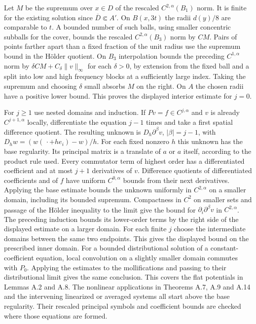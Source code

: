 \documentclass[
  english,
  11pt,
  reqno]{amsart}
\begin{document}
Let \(M\) be the supremum over \(x\in D\) of the rescaled
\(C^{2,\alpha}(B_1)\) norm. It is finite for the existing solution since
\(\overline D\Subset A'\). On \(B(x,3t)\) the radii \(d(y)/8\) are
comparable to \(t\). A bounded number of such balls, using smaller
concentric subballs for the cover, bounds the rescaled
\(C^{2,\alpha}(B_3)\) norm by \(C M\). Pairs of points farther apart
than a fixed fraction of the unit radius use the supremum bound in the
Hölder quotient. On \(B_3\) interpolation bounds the preceding
\(C^{1,\alpha}\) norm by \(\delta C M+C_\delta\|v\|_\infty\) for each
\(\delta>0\), by extension from the fixed ball and a split into low and
high frequency blocks at a sufficiently large index. Taking the supremum
and choosing \(\delta\) small absorbs \(M\) on the right. On \(A\) the
chosen radii have a positive lower bound. This proves the displayed
interior estimate for \(j=0\).

For \(j\ge1\) use nested domains and induction. If
\(Pv=f\in C^{j,\alpha}\) and \(v\) is already \(C^{j+1,\alpha}\)
locally, differentiate the equation \(j-1\) times and take a first
spatial difference quotient. The resulting unknown is
\(D_h\partial^\beta v\), \(|\beta|=j-1\), with
\(D_h w=(w(\,\cdot+h e_i)-w)/h\). For each fixed nonzero \(h\) this
unknown has the base regularity. Its principal matrix is a translate of
\(a\) or \(a\) itself, according to the product rule used. Every
commutator term of highest order has a differentiated coefficient and at
most \(j+1\) derivatives of \(v\). Difference quotients of
differentiated coefficients and of \(f\) have uniform \(C^{0,\alpha}\)
bounds from their next derivatives. Applying the base estimate bounds
the unknown uniformly in \(C^{2,\alpha}\) on a smaller domain, including
its bounded supremum. Compactness in \(C^2\) on smaller sets and passage
of the Hölder inequality to the limit give the bound for
\(\partial_i\partial^\beta v\) in \(C^{2,\alpha}\). The preceding
induction bounds its lower-order terms by the right side of the
displayed estimate on a larger domain. For each finite \(j\) choose the
intermediate domains between the same two endpoints. This gives the
displayed bound on the prescribed inner domain. For a bounded
distributional solution of a constant-coefficient equation, local
convolution on a slightly smaller domain commutes with \(P_0\). Applying
the estimates to the mollifications and passing to their distributional
limit gives the same conclusion. This covers the flat potentials in
Lemmas A.2 and A.8. The nonlinear applications in Theorems A.7, A.9 and
A.14 and the intervening linearized or averaged systems all start above
the base regularity. Their rescaled principal symbols and coefficient
bounds are checked where those equations are formed.
\end{document}
